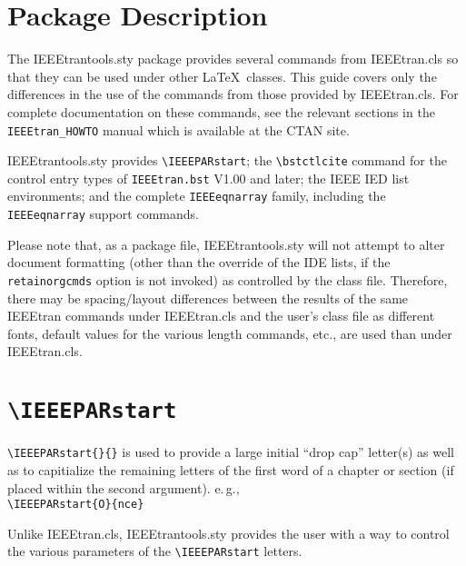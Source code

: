 \documentclass[pagesize=auto]{scrartcl}
\begin{document}
\section{Package Description}

The \textsf{IEEEtrantools.sty} package provides several commands from \textsf{IEEEtran.cls}
so that they can be used under other \LaTeX\ classes. This guide covers only
the differences in the use of the commands from those provided by
\textsf{IEEEtran.cls}. For complete documentation on these commands, see the relevant
sections in the \texttt{IEEEtran\_HOWTO} manual which is available at the CTAN site.

\textsf{IEEEtrantools.sty} provides \verb+\IEEEPARstart+; the \verb+\bstctlcite+ command for the
control entry types of \texttt{IEEEtran.bst} V1.00 and later; the IEEE IED list
environments; and the complete \texttt{IEEEeqnarray} family, including the
\texttt{IEEEeqnarray} support commands.

Please note that, as a package file, \textsf{IEEEtrantools.sty} will not attempt
to alter document formatting (other than the override of the IDE lists,
if the \texttt{retainorgcmds} option is not invoked) as controlled by the class
file. Therefore, there may be spacing/layout differences between the
results of the same \textsf{IEEEtran} commands under \textsf{IEEEtran.cls} and the user's
class file as different fonts, default values for the various length
commands, etc., are used than under \textsf{IEEEtran.cls}.


\section{\texttt{\textbackslash IEEEPARstart}}

\verb+\IEEEPARstart{}{}+ is used to provide a large initial ``drop cap'' letter(s) as
well as to capitialize the remaining letters of the first word of a chapter
or section (if placed within the second argument). e.\,g.,\\
\verb+\IEEEPARstart{O}{nce}+

Unlike \textsf{IEEEtran.cls}, \textsf{IEEEtrantools.sty} provides the user with a way to
control the various parameters of the \verb+\IEEEPARstart+ letters.
\end{document}
